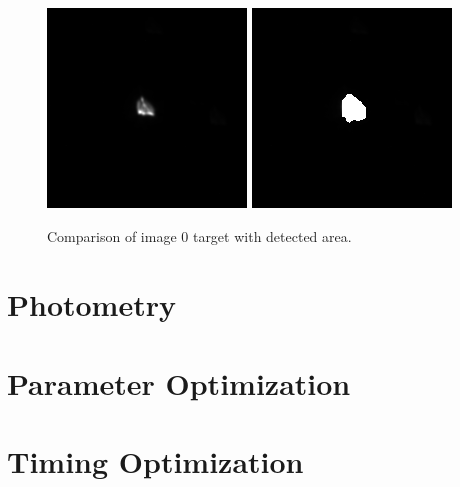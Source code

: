 \documentclass{aa}
\begin{document}
\begin{figure}
\centering

\includegraphics[width=.2\textwidth]{img_0.png}
\includegraphics[width=.2\textwidth]{img_0_canny.png}

\caption{Comparison of image 0 target with detected area.}
\label{fig:img_0_canny}
\end{figure}




\section{Photometry}

\section{Parameter Optimization} \label{sec:param_opt}

\section{Timing Optimization}


%

%
%
\end{document}
